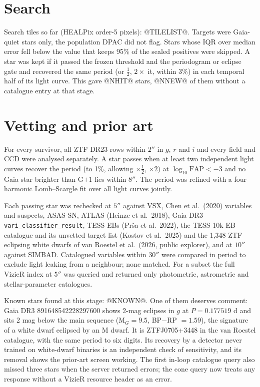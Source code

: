 \documentclass[11pt]{article}
\begin{document}
\section{Search}
Search tiles so far (HEALPix order-5 pixels): @TILELIST@. Targets were Gaia-quiet stars only, the population DPAC did not flag. Stars whose IQR over median error fell below the value that keeps 95\% of the sealed positives were skipped. A star was kept if it passed the frozen threshold and the periodogram or eclipse gate and recovered the same period (or $\tfrac12$, $2\times$ it, within 3\%) in each temporal half of its light curve. This gave @NHIT@ stars, @NNEW@ of them without a catalogue entry at that stage.

\section{Vetting and prior art}\label{sec:vet}
For every survivor, all ZTF DR23 rows within $2''$ in $g$, $r$ and $i$ and every field and CCD were analysed separately. A star passes when at least two independent light curves recover the period (to 1\%, allowing $\times\tfrac12$, $\times2$) at $\log_{10}\mathrm{FAP}<-3$ and no Gaia star brighter than G$+1$ lies within $8''$. The period was refined with a four-harmonic Lomb--Scargle fit over all light curves jointly.

Each passing star was rechecked at $5''$ against VSX, Chen et al.\ (2020) variables and suspects, ASAS-SN, ATLAS (Heinze et al.\ 2018), Gaia DR3 \texttt{vari\_classifier\_result}, TESS EBs (Prša et al.\ 2022), the TESS 10k EB catalogue and its unvetted target list (Kostov et al.\ 2025) and the 1{,}348 ZTF eclipsing white dwarfs of van Roestel et al.\ (2026, public explorer), and at $10''$ against SIMBAD. Catalogued variables within $30''$ were compared in period to exclude light leaking from a neighbour; none matched. For a subset the full VizieR index at $5''$ was queried and returned only photometric, astrometric and stellar-parameter catalogues.

Known stars found at this stage: @KNOWN@. One of them deserves comment: Gaia DR3 891648542228297600 shows 2-mag eclipses in $g$ at $P=0.177519$ d and sits 2 mag below the main sequence (M$_G=9.5$, BP$-$RP $=1.59$), the signature of a white dwarf eclipsed by an M dwarf. It is ZTFJ0705+3448 in the van Roestel catalogue, with the same period to six digits. Its recovery by a detector never trained on white-dwarf binaries is an independent check of sensitivity, and its removal shows the prior-art screen working. The first in-loop catalogue query also missed three stars when the server returned errors; the cone query now treats any response without a VizieR resource header as an error.
\end{document}
